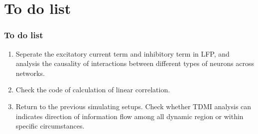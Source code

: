 \documentclass{beamer}
\begin{document}
\section{To do list}
\begin{frame}
  \frametitle{To do list}
  \begin{enumerate}
    \item Seperate the excitatory current term and inhibitory term in LFP, and analysis the causality of interactions between different types of neurons across networks.
    \item Check the code of calculation of linear correlation.
    \item Return to the previous simulating setups. Check whether TDMI analysis can indicates direction of information flow among all dynamic region or within specific circumstances.
  \end{enumerate}
\end{frame}
%
\end{document}

